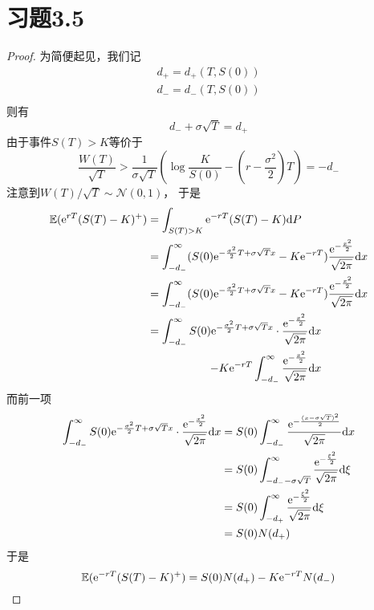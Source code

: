 \documentclass[cn]{homework}
\newcommand{\E}{\mathbb E}
\begin{document}
    \section{习题3.5}
    \begin{proof}
        为简便起见，我们记
        \[\begin{aligned}
            d_+=d_+(T,S(0))\\
            d_-=d_-(T,S(0))\\
        \end{aligned}\]
        则有
        \[d_-+\sigma\sqrt T=d_+\]
        由于事件$S(T)>K$等价于
        \[\frac{W(T)}{\sqrt{T}}>
        \frac{1}{\sigma\sqrt{T}}
        \left(\log\frac{K}{S(0)}-\left(r-\frac{\sigma^2}2\right)T\right)=-d_-\]
        注意到$W(T)/\sqrt{T}\sim\mathcal N(0,1)$，
        于是
        \[\begin{aligned}
            \E(\e^{rT}(S(T)-K)^+)
            &=\int_{S(T)>K}\e^{-rT}(S(T)-K)\diff P\\
            &=\int_{-d_-}^\infty
              (S(0)\e^{-\frac{\sigma^2}{2}T+\sigma\sqrt{T}x}
              -K\e^{-rT})\frac{\e^{-\frac{x^2}{2}}}{\sqrt{2\pi}}\diff x\\
            &=\int_{-d_-}^\infty
              (S(0)\e^{-\frac{\sigma^2}{2}T+\sigma\sqrt{T}x}
              -K\e^{-rT})\frac{\e^{-\frac{x^2}{2}}}{\sqrt{2\pi}}\diff x\\
            &=\begin{aligned}[t]
                \int_{-d_-}^\infty S(0)\e^{-\frac{\sigma^2}{2}T+\sigma\sqrt{T}x}
                \cdot\frac{\e^{-\frac{x^2}{2}}}{\sqrt{2\pi}}\diff x\\
                -K\e^{-rT}\int_{-d_-}^\infty
                \frac{\e^{-\frac{x^2}{2}}}{\sqrt{2\pi}}\diff x
            \end{aligned}
        \end{aligned}\]
        而前一项
        \[\begin{aligned}
            \int_{-d_-}^\infty S(0)
            \mathrm e^{-\frac{\sigma^2}{2}T+\sigma\sqrt{T}x}
            \cdot\frac{\mathrm e^{-\frac{x^2}{2}}}{\sqrt{2\pi}}\mathrm d x
            &=S(0)\int_{-d_-}^\infty
             \frac{\mathrm e^{-\frac{(x-\sigma\sqrt{T})^2}{2}}}{\sqrt{2\pi}}\mathrm d x\\
            &=S(0)\int_{-d_--\sigma\sqrt{T}}^\infty\frac{\mathrm e^{-\frac{\xi^2}{2}}}{\sqrt{2\pi}}
             \mathrm d\xi\\
            &=S(0)\int_{-d_+}^\infty\frac{\mathrm e^{-\frac{\xi^2}{2}}}{\sqrt{2\pi}}
             \mathrm d\xi\\
            &=S(0)N(d_+)
        \end{aligned}\]
        于是
        \[\E(\e^{-rT}(S(T)-K)^+)=S(0)N(d_+)-K\e^{-rT}N(d_-)\]
    \end{proof}
\end{document}
